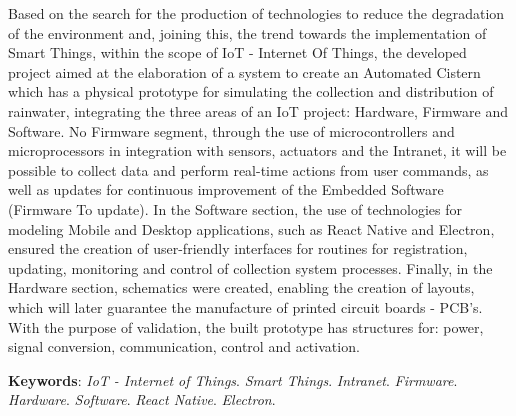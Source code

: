
\begin{resumo}[ABSTRACT]
\begin{SingleSpacing}


Based on the search for the production of technologies to reduce the degradation of the environment and, joining this, the trend towards the implementation of Smart Things, within the scope of IoT - Internet Of Things, the developed project aimed at the elaboration of a system to create an Automated Cistern which has a physical prototype for simulating the collection and distribution of rainwater, integrating the three areas of an IoT project: Hardware, Firmware and Software. No Firmware segment, through the use of microcontrollers and microprocessors in integration with sensors, actuators and the Intranet, it will be possible to collect data and perform real-time actions from user commands, as well as updates for continuous improvement of the Embedded Software (Firmware To update). In the Software section, the use of technologies for modeling Mobile and Desktop applications, such as React Native and Electron, ensured the creation of user-friendly interfaces for routines for registration, updating, monitoring and control of collection system processes. Finally, in the Hardware section, schematics were created, enabling the creation of layouts, which will later guarantee the manufacture of printed circuit boards - PCB's. With the purpose of validation, the built prototype has structures for: power, signal conversion, communication, control and activation.


\vspace{\onelineskip}

\textbf{Keywords}: \textit{IoT - Internet of Things}. \textit{Smart Things}. \textit{Intranet}.   \textit{Firmware}. \textit{Hardware}. \textit{Software}. \textit{React Native}. \textit{Electron}.

\end{SingleSpacing}
\end{resumo}

